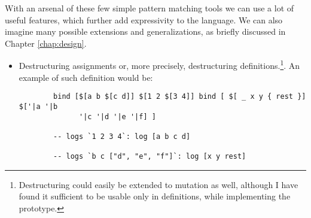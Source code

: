 With an arsenal of these few simple pattern matching tools we can use a lot of
useful features, which further add expressivity to the language. We can also
imagine many possible extensions and generalizations, as briefly discussed in
Chapter \ref{chap:design}.

\begin{itemize}
    \item Destructuring assignments or, more precisely, destructuring
      definitions.\footnote{Destructuring could easily be extended to mutation
        as well, although I have found it sufficient to be usable only in
        definitions, while implementing the prototype.}. An example of such
      definition would be:
    \begin{lstlisting}
        bind [$[a b $[c d]] $[1 2 $[3 4]] bind [ $[ _ x y { rest }] $['|a '|b
              '|c '|d '|e '|f] ]
        
        -- logs `1 2 3 4`: log [a b c d]
        
        -- logs `b c ["d", "e", "f"]`: log [x y rest]
    \end{lstlisting}
\end{itemize}


